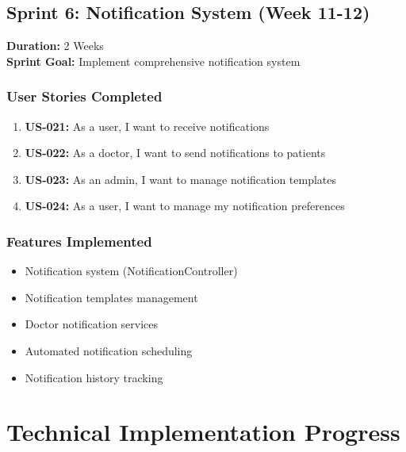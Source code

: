 \documentclass[12pt,a4paper]{article}
\begin{document}
\subsection{Sprint 6: Notification System (Week 11-12)}
\textbf{Duration:} 2 Weeks \\
\textbf{Sprint Goal:} Implement comprehensive notification system

\subsubsection{User Stories Completed}
\begin{enumerate}
    \item \textbf{US-021:} As a user, I want to receive notifications
    \item \textbf{US-022:} As a doctor, I want to send notifications to patients
    \item \textbf{US-023:} As an admin, I want to manage notification templates
    \item \textbf{US-024:} As a user, I want to manage my notification preferences
\end{enumerate}

\subsubsection{Features Implemented}
\begin{itemize}
    \item Notification system (NotificationController)
    \item Notification templates management
    \item Doctor notification services
    \item Automated notification scheduling
    \item Notification history tracking
\end{itemize}

\section{Technical Implementation Progress}
\end{document}
